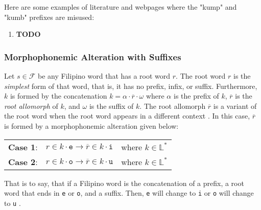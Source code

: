 \begin{example}
    Here are some examples of literature and webpages where the "kump" and "kumb"
    prefixes are misused:
\end{example}
\begin{enumerate}
    \item \textbf{TODO}
\end{enumerate}

\subsubsection{Morphophonemic Alteration with Suffixes}

Let \(s \in \mathcal{F}\) be any Filipino word that has a root word \(r\). The root word
\(r\) is the \textit{simplest} form of that word, that is, it has no prefix, infix, or suffix.
Furthermore, \(k\) is formed by the concatenation \(k = \alpha\cdot\overline{r}\cdot\omega\)
where \(\alpha\) is the prefix of \(k\), \(\overline{r}\) is the \textit{root allomorph} of \(k\),
and \(\omega\) is the suffix of \(k\). The root allomorph \(\overline{r}\) is a variant of
the root word when the root word appears in a different context \cite{OOP}. In this case, \(\overline{r}\)
is formed by a morphophonemic alteration given below:

\begin{tabular}{l c r}
    \textbf{Case 1}: & \(r\in k\cdot \texttt{e} \rightarrow \overline{r} \in k \cdot \texttt{i}\) & where \(k \in \mathbb{L}^*\) \\
    \textbf{Case 2}: & \(r\in k\cdot \texttt{o} \rightarrow \overline{r} \in k \cdot \texttt{u}\) & where \(k \in \mathbb{L}^*\)
\end{tabular}

That is to say, that if a Filipino word is the concatenation of a prefix, a root word that
ends in \texttt{e} or \texttt{o}, and a suffix. Then, \texttt{e} will change to \texttt{i} or \texttt{o} will change
to \texttt{u} \cite{Yap_1967}.

